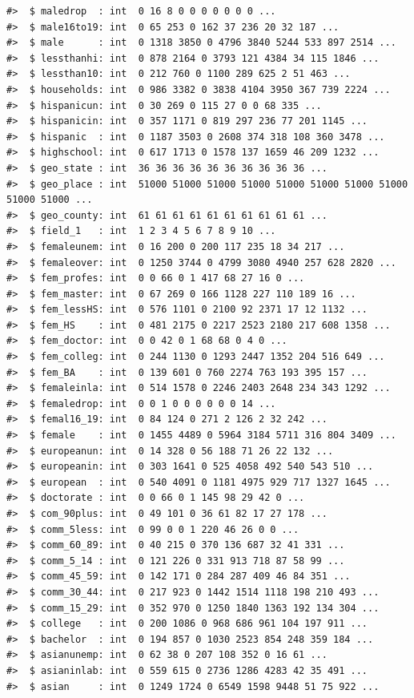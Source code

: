 \documentclass[
  11pt,
]{book}
\begin{document}
\begin{verbatim}
#>  $ maledrop  : int  0 16 8 0 0 0 0 0 0 0 ...
#>  $ male16to19: int  0 65 253 0 162 37 236 20 32 187 ...
#>  $ male      : int  0 1318 3850 0 4796 3840 5244 533 897 2514 ...
#>  $ lessthanhi: int  0 878 2164 0 3793 121 4384 34 115 1846 ...
#>  $ lessthan10: int  0 212 760 0 1100 289 625 2 51 463 ...
#>  $ households: int  0 986 3382 0 3838 4104 3950 367 739 2224 ...
#>  $ hispanicun: int  0 30 269 0 115 27 0 0 68 335 ...
#>  $ hispanicin: int  0 357 1171 0 819 297 236 77 201 1145 ...
#>  $ hispanic  : int  0 1187 3503 0 2608 374 318 108 360 3478 ...
#>  $ highschool: int  0 617 1713 0 1578 137 1659 46 209 1232 ...
#>  $ geo_state : int  36 36 36 36 36 36 36 36 36 36 ...
#>  $ geo_place : int  51000 51000 51000 51000 51000 51000 51000 51000 51000 51000 ...
#>  $ geo_county: int  61 61 61 61 61 61 61 61 61 61 ...
#>  $ field_1   : int  1 2 3 4 5 6 7 8 9 10 ...
#>  $ femaleunem: int  0 16 200 0 200 117 235 18 34 217 ...
#>  $ femaleover: int  0 1250 3744 0 4799 3080 4940 257 628 2820 ...
#>  $ fem_profes: int  0 0 66 0 1 417 68 27 16 0 ...
#>  $ fem_master: int  0 67 269 0 166 1128 227 110 189 16 ...
#>  $ fem_lessHS: int  0 576 1101 0 2100 92 2371 17 12 1132 ...
#>  $ fem_HS    : int  0 481 2175 0 2217 2523 2180 217 608 1358 ...
#>  $ fem_doctor: int  0 0 42 0 1 68 68 0 4 0 ...
#>  $ fem_colleg: int  0 244 1130 0 1293 2447 1352 204 516 649 ...
#>  $ fem_BA    : int  0 139 601 0 760 2274 763 193 395 157 ...
#>  $ femaleinla: int  0 514 1578 0 2246 2403 2648 234 343 1292 ...
#>  $ femaledrop: int  0 0 1 0 0 0 0 0 0 14 ...
#>  $ femal16_19: int  0 84 124 0 271 2 126 2 32 242 ...
#>  $ female    : int  0 1455 4489 0 5964 3184 5711 316 804 3409 ...
#>  $ europeanun: int  0 14 328 0 56 188 71 26 22 132 ...
#>  $ europeanin: int  0 303 1641 0 525 4058 492 540 543 510 ...
#>  $ european  : int  0 540 4091 0 1181 4975 929 717 1327 1645 ...
#>  $ doctorate : int  0 0 66 0 1 145 98 29 42 0 ...
#>  $ com_90plus: int  0 49 101 0 36 61 82 17 27 178 ...
#>  $ comm_5less: int  0 99 0 0 1 220 46 26 0 0 ...
#>  $ comm_60_89: int  0 40 215 0 370 136 687 32 41 331 ...
#>  $ comm_5_14 : int  0 121 226 0 331 913 718 87 58 99 ...
#>  $ comm_45_59: int  0 142 171 0 284 287 409 46 84 351 ...
#>  $ comm_30_44: int  0 217 923 0 1442 1514 1118 198 210 493 ...
#>  $ comm_15_29: int  0 352 970 0 1250 1840 1363 192 134 304 ...
#>  $ college   : int  0 200 1086 0 968 686 961 104 197 911 ...
#>  $ bachelor  : int  0 194 857 0 1030 2523 854 248 359 184 ...
#>  $ asianunemp: int  0 62 38 0 207 108 352 0 16 61 ...
#>  $ asianinlab: int  0 559 615 0 2736 1286 4283 42 35 491 ...
#>  $ asian     : int  0 1249 1724 0 6549 1598 9448 51 75 922 ...

\end{verbatim}
\end{document}
